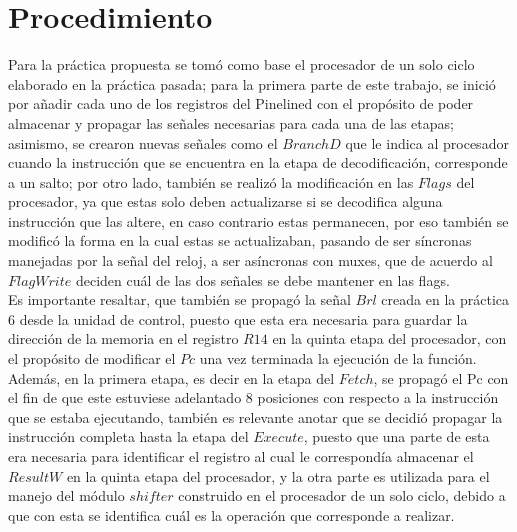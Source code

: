 \section*{Procedimiento}
Para la práctica propuesta se tomó como base el procesador de un solo ciclo elaborado en la práctica pasada; para la primera parte de este trabajo, se inició por añadir cada uno de los registros del Pinelined con el propósito de poder almacenar y propagar las señales necesarias para cada una de las etapas; asimismo, se crearon nuevas señales como el $BranchD$ que le indica al procesador cuando la instrucción que se encuentra en la etapa de decodificación, corresponde a un salto; por otro lado, también se realizó la modificación en las $Flags$ del procesador, ya que estas solo deben actualizarse si se decodifica alguna instrucción que las altere, en caso contrario estas permanecen, por eso también se modificó la forma en la cual estas se actualizaban, pasando de ser síncronas manejadas por la señal del reloj, a ser asíncronas con muxes, que de acuerdo al $FlagWrite$ deciden cuál de las dos señales se debe mantener en las flags.\\

Es importante resaltar, que también se propagó la señal $Brl$ creada en la práctica 6 desde la unidad de control, puesto que esta era necesaria para guardar la dirección de la memoria en el registro $R14$ en la quinta etapa del procesador, con el propósito de modificar el $Pc$ una vez terminada la ejecución de la función. Además, en la primera etapa, es decir en la etapa del $Fetch$, se propagó el Pc con el fin de que este estuviese adelantado 8 posiciones con respecto a la instrucción que se estaba ejecutando, también es relevante anotar que se decidió propagar la instrucción completa hasta la etapa del $Execute$, puesto que una parte de esta era necesaria para identificar el registro al cual le correspondía almacenar el $ResultW$ en la quinta etapa del procesador, y la otra parte es utilizada para el manejo del módulo $shifter$ construido en el procesador de un solo ciclo, debido a que con esta se identifica cuál es la operación que corresponde a realizar.\\

